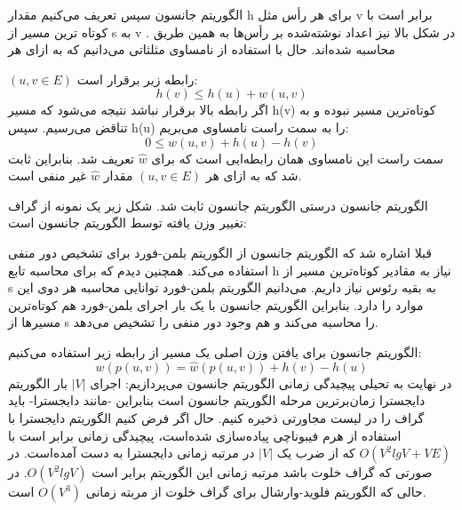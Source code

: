 \begin{itemframe}{الگوریتم جانسون}
\itm
سپس تعریف می‌کنیم مقدار h برای هر رأس مثل v برابر است با کوتاه ترین مسیر از s به v . در شکل بالا نیز اعداد نوشته‌شده بر رأس‌ها به همین طریق محاسبه شده‌اند.
\itm
حال با استفاده از نامساوی مثلثاتی می‌دانیم که به ازای هر

$(u, v \in E)$
رابطه زیر برقرار است:
$$
h(v) \leqslant h(u)+w(u, v)
$$
\itm
اگر رابطه بالا برقرار نباشد نتیجه می‌شود که مسیر h(v) کوتاه‌ترین مسیر نبوده و به تناقض می‌رسیم.
\itm
سپس h(u) را به سمت راست نامساوی می‌بریم:
$$
0\leqslant w(u, v) + h(u) - h(v)
$$
\itm
سمت راست این نامساوی همان رابطه‌ایی است که برای $\hat{w}$ تعریف شد. بنابراین ثابت شد که به ازای هر
$(u, v \in E)$
مقدار $\hat{w}$ غیر منفی است.
\end{itemframe}

\begin{itemframe}{الگوریتم جانسون}
\itm
درستی الگوریتم جانسون ثابت شد. شکل زیر یک نمونه از گراف تغییر وزن یافته توسط الگوریتم جانسون است:

\itm
قبلا اشاره شد که الگوریتم جانسون از الگوریتم بلمن-فورد برای تشخیص دور منفی استفاده می‌کند. همچنین دیدم که برای محاسبه تابع h نیاز به مقادیر کوتاه‌ترین مسیر از s به بقیه رئوس نیاز داریم. می‌دانیم الگوریتم بلمن-فورد توانایی محاسبه هر دوی این موارد را دارد. بنابراین الگوریتم جانسون با یک بار اجرای بلمن-فورد هم کوتاه‌ترین مسیرها از s را محاسبه می‌کند و هم وجود دور منفی را تشخیص می‌دهد.
\end{itemframe}

\begin{itemframe}{الگوریتم جانسون}
\itm
برای یافتن وزن اصلی یک مسیر از رابطه زیر استفاده می‌کنیم:
$$
w(p(u, v)) = \hat{w}(p(u, v)) + h(v) - h(u)
$$
\itm
در نهایت به تحیلی پیچیدگی زمانی الگوریتم جانسون می‌پردازیم:
\itm
اجرای $|V|$ بار الگوریتم دایجسترا زمان‌برترین مرحله الگوریتم جانسون است بنابراین -مانند دایجسترا- باید گراف را در لیست مجاورتی ذخیره کنیم. حال اگر فرض کنیم الگوریتم دایجسترا با استفاده از هرم فیبوناچی پیاده‌سازی شده‌است، پیچیدگی زمانی برابر است با
$O(V^2lgV+VE)$
که از ضرب یک
$|V|$
در مرتبه زمانی دایجسترا به دست آمده‌است.
\itm
در صورتی که گراف خلوت باشد مرتبه زمانی این الگوریتم برابر است
$O(V^2lgV)$.
در حالی که الگوریتم فلوید-وارشال برای گراف خلوت از مربته زمانی
$O(V^3)$
است.
\end{itemframe}